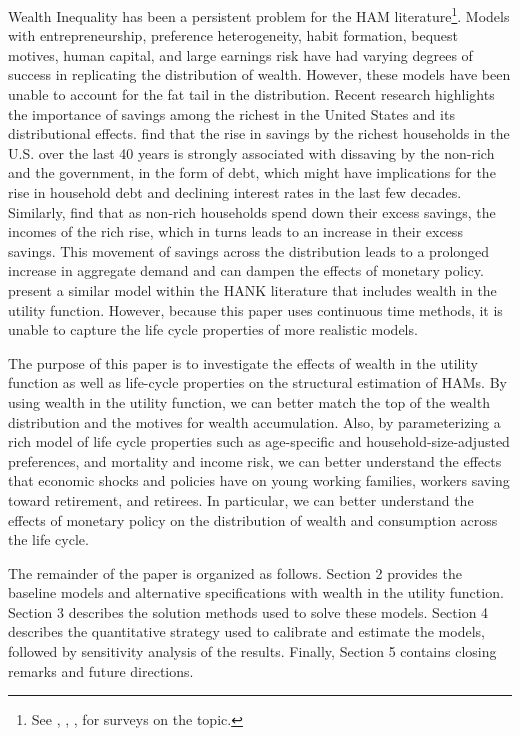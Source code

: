 \documentclass{article}
\begin{document}
Wealth Inequality has been a persistent problem for the HAM literature\footnote{See \cite{Cagetti_2008}, \cite{De_Nardi_2015}, \cite{De_Nardi_2017}, for surveys on the topic.}. Models with entrepreneurship, preference heterogeneity, habit formation, bequest motives, human capital, and large earnings risk have had varying degrees of success in replicating the distribution of wealth. However, these models have been unable to account for the fat tail in the distribution. Recent research highlights the importance of savings among the richest in the United States and its distributional effects. \cite{Mian_2020} find that the rise in savings by the richest households in the U.S. over the last 40 years is strongly associated with dissaving by the non-rich and the government, in the form of debt, which might have implications for the rise in household debt and declining interest rates in the last few decades. Similarly, \cite{Auclert_2023} find that as non-rich households spend down their excess savings, the incomes of the rich rise, which in turns leads to an increase in their excess savings. This movement of savings across the distribution leads to a prolonged increase in aggregate demand and can dampen the effects of monetary policy. \cite{Michaillat_2021} present a similar model within the HANK literature that includes wealth in the utility function. However, because this paper uses continuous time methods, it is unable to capture the life cycle properties of more realistic models.

The purpose of this paper is to investigate the effects of wealth in the utility function as well as life-cycle properties on the structural estimation of HAMs. By using wealth in the utility function, we can better match the top of the wealth distribution and the motives for wealth accumulation. Also, by parameterizing a rich model of life cycle properties such as age-specific and household-size-adjusted preferences, and mortality and income risk, we can better understand the effects that economic shocks and policies have on young working families, workers saving toward retirement, and retirees. In particular, we can better understand the effects of monetary policy on the distribution of wealth and consumption across the life cycle.

The remainder of the paper is organized as follows. Section 2 provides the baseline models and alternative specifications with wealth in the utility function. Section 3 describes the solution methods used to solve these models. Section 4 describes the quantitative strategy used to calibrate and estimate the models, followed by sensitivity analysis of the results. Finally, Section 5 contains closing remarks and future directions.
\end{document}
